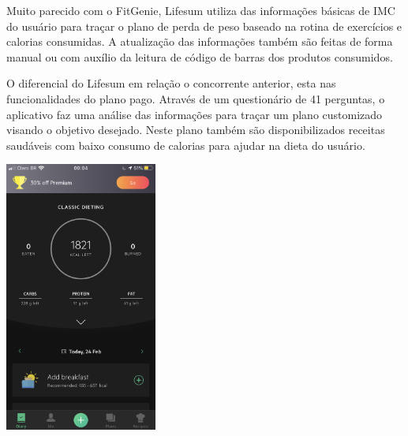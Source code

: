 \documentclass[a4paper, 11pt]{article}
\begin{document}
Muito parecido com o FitGenie, \textsf{Lifesum} utiliza das informações básicas de IMC do usuário para traçar o plano de perda de peso baseado na rotina de exercícios e calorias consumidas. A atualização das informações também são feitas de forma manual ou com auxílio da leitura de código de barras dos produtos consumidos.

O diferencial do Lifesum em relação o concorrente anterior, esta nas funcionalidades do plano pago. Através de um questionário de 41 perguntas, o aplicativo faz uma análise das informações para traçar um plano customizado visando o objetivo desejado. Neste plano também são disponibilizados receitas saudáveis com baixo consumo de calorias para ajudar na dieta do usuário.

\begin{center}
    \includegraphics[width=5cm]{lifesum_print.png}
\end{center} 
\end{document}
